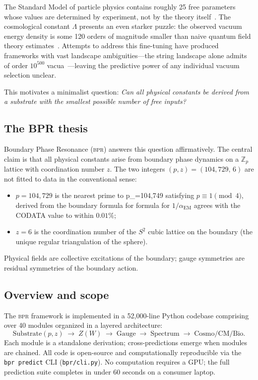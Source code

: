 \documentclass[aps,prd,twocolumn,superscriptaddress,longbibliography,nofootinbib]{revtex4-2}
\newcommand{\Zp}{\mathbb{Z}_p}
\newcommand{\Stwo}{S^2}
\newcommand{\alphaEM}{\alpha_{\mathrm{EM}}}
\newcommand{\Zimp}{Z}
\newcommand{\bpr}{\textsc{bpr}}
\begin{document}
The Standard Model of particle physics contains roughly 25 free
parameters whose values are determined by experiment, not by the
theory itself~\cite{PDG2024}.  The cosmological constant
$\Lambda$ presents an even starker puzzle: the observed vacuum
energy density is some 120 orders of magnitude smaller than naive
quantum field theory estimates~\cite{Weinberg1989}.  Attempts to
address this fine-tuning have produced frameworks with vast
landscape ambiguities---the string landscape alone admits of order
$10^{500}$ vacua~\cite{Bousso2000}---leaving the predictive power
of any individual vacuum selection unclear.

This motivates a minimalist question: \textit{Can all physical
constants be derived from a substrate with the smallest possible
number of free inputs?}

\subsection{The BPR thesis}

Boundary Phase Resonance (\bpr) answers this question affirmatively.
The central claim is that all physical constants arise from boundary
phase dynamics on a $\Zp$ lattice with coordination number $z$.
The two integers $(p, z) = (104{,}729,\, 6)$ are not fitted to
data in the conventional sense:
\begin{itemize}
\item $p = 104{,}729$ is the nearest prime to p_=104{,}749 satisfying $p\equiv 1\pmod{4}$, derived from the boundary formula for
  formula for $1/\alphaEM$ agrees with the CODATA value to within
  $0.01\%$;
\item $z = 6$ is the coordination number of the $\Stwo$ cubic
  lattice on the boundary (the unique regular triangulation of the
  sphere).
\end{itemize}
Physical fields are collective excitations of the boundary; gauge
symmetries are residual symmetries of the boundary action.

\subsection{Overview and scope}

The \bpr{} framework is implemented in a 52{,}000-line Python
codebase comprising over 40 modules organized in a layered
architecture:
\begin{equation}
\text{Substrate}(p,z) \;\to\; \Zimp(W) \;\to\;
\text{Gauge} \;\to\; \text{Spectrum} \;\to\;
\text{Cosmo/CM/Bio}.
\label{eq:architecture}
\end{equation}
Each module is a standalone derivation; cross-predictions emerge
when modules are chained.  All code is open-source and
computationally reproducible via the \texttt{bpr predict} CLI
(\texttt{bpr/cli.py}).  No computation requires a GPU; the full
prediction suite completes in under 60 seconds on a consumer
laptop.
\end{document}
